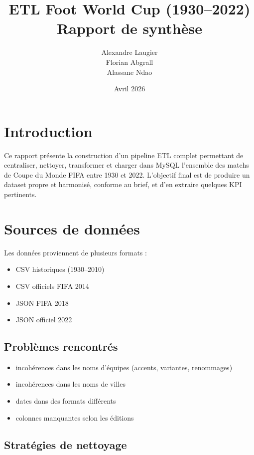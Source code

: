 \documentclass[12pt,a4paper]{article}
\title{ETL Foot World Cup (1930--2022) \\ \large Rapport de synthèse}
\author{Alexandre Laugier \\ Florian Abgrall \\ Alassane Ndao}
\date{Avril 2026}
\begin{document}
\maketitle
\tableofcontents
\newpage

\section{Introduction}

Ce rapport présente la construction d'un pipeline ETL complet permettant de centraliser, nettoyer, transformer et charger dans MySQL l'ensemble des matchs de Coupe du Monde FIFA entre 1930 et 2022.  
L'objectif final est de produire un dataset propre et harmonisé, conforme au brief, et d'en extraire quelques KPI pertinents.

\newpage
\section{Sources de données}

Les données proviennent de plusieurs formats :

\begin{itemize}
    \item CSV historiques (1930--2010)
    \item CSV officiels FIFA 2014
    \item JSON FIFA 2018
    \item JSON officiel 2022
\end{itemize}

\subsection*{Problèmes rencontrés}

\begin{itemize}
    \item incohérences dans les noms d'équipes (accents, variantes, renommages)
    \item incohérences dans les noms de villes
    \item dates dans des formats différents
    \item colonnes manquantes selon les éditions
\end{itemize}

\subsection*{Stratégies de nettoyage}
\end{document}
